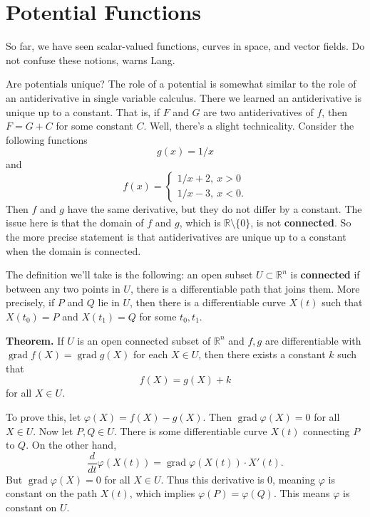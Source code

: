 \documentclass{article}
\DeclareMathOperator{\grd}{grad}
\begin{document}
\section*{Potential Functions}

So far, we have seen scalar-valued functions, curves in space, and vector fields. Do not confuse these notions, warns
Lang.

Are potentials unique? The role of a potential is somewhat similar to the role of an antiderivative
in single variable calculus. There we learned an antiderivative is unique up to a constant. That is,
if $F$ and $G$ are two antiderivatives of $f$, then $F = G + C$ for some constant $C$. Well, there's a 
slight technicality. Consider the following functions 
\[g(x) = 1/x\]
and
\[f(x) = \begin{cases}
    1/x + 2,\ x>0\\
    1/x - 3,\ x<0.
\end{cases}\]
Then $f$ and $g$ have the same derivative, but they do not differ by a constant. The issue here is that
the domain of $f$ and $g$, which is $\mathbb{R} \setminus \{0\}$, is not \textbf{connected}.
So the more precise statement is that antiderivatives are unique up to a constant when the domain is connected.

The definition we'll take is the following: an open subset $U \subset \mathbb{R}^n$ is \textbf{connected} if 
between any two points in $U$, there is a differentiable path that joins them. More precisely,
if $P$ and $Q$ lie in $U$, then there is a differentiable curve $X(t)$ such that $X(t_0) = P$ and
$X(t_1) = Q$ for some $t_0,t_1$.

\textbf{Theorem.} If $U$ is an open connected subset of $\mathbb{R}^n$ and $f,g$ are differentiable with 
$\grd f(X) = \grd g(X)$ for each $X \in U$, then there exists a constant $k$ such that 
\[f(X) = g(X) + k\]
for all $X \in U$.

To prove this, let $\varphi(X) = f(X) - g(X)$. Then $\grd \varphi (X) = 0$ for all $X \in U$. Now let
$P,Q \in U$. There is some differentiable curve $X(t)$ connecting $P$ to $Q$. On the other hand,
\[\frac{d}{dt} \varphi(X(t)) = \grd\varphi(X(t))\cdot X'(t).\]
But $\grd \varphi (X) = 0$ for all $X \in U$. Thus this derivative is $0$, meaning $\varphi$ is constant
on the path $X(t)$, which implies $\varphi(P) = \varphi(Q)$. This means $\varphi$ is constant on $U$.
\end{document}
